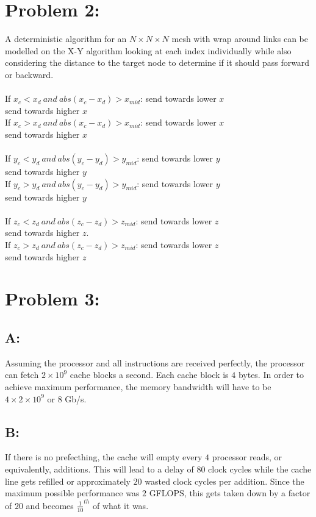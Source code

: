 \documentclass{article}
\begin{document}
\section*{Problem 2:}
A deterministic algorithm for an $N\times N\times N$ mesh with wrap 
around links can be modelled on the X-Y algorithm looking at each
index individually while also considering the distance to the 
target node to determine if it should pass forward or backward.\\\\
If $x_c < x_d\ and\ abs(x_c - x_d) > x_{mid}$: send towards lower $x$\\ 
send towards higher $x$\\
If $x_c > x_d\ and\ abs(x_c - x_d) > x_{mid}$: send towards lower $x$\\ 
send towards higher $x$\\\\
If $y_c < y_d\ and\ abs(y_c - y_d) > y_{mid}$: send towards lower $y$\\
send towards higher $y$\\
If $y_c > y_d\ and\ abs(y_c - y_d) > y_{mid}$: send towards lower $y$\\
send towards higher $y$\\\\
If $z_c < z_d\ and\ abs(z_c - z_d) > z_{mid}$: send towards lower $z$\\
send towards higher $z$.\\
If $z_c > z_d\ and\ abs(z_c - z_d) > z_{mid}$: send towards lower $z$\\ 
send towards higher $z$
\section*{Problem 3:}
\subsection*{A:}
Assuming the processor and all instructions are received perfectly, the
processor can fetch $2\times10^9$ cache blocks a second.  Each cache
block is $4$ bytes.  In order to achieve maximum performance, the
memory bandwidth will have to be $4\times2\times10^9$ or $8$ Gb/s.
\subsection*{B:}
If there is no prefecthing, the cache will empty every $4$ processor
reads, or equivalently, additions.  This will lead to a delay of $80$
clock cycles while the cache line gets refilled or approximately
$20$ wasted clock cycles per addition.  Since the maximum possible
performance was $2$ GFLOPS, this gets taken down by a factor of $20$
and becomes $\frac{1}{10}^{th}$ of what it was. 
\end{document}
